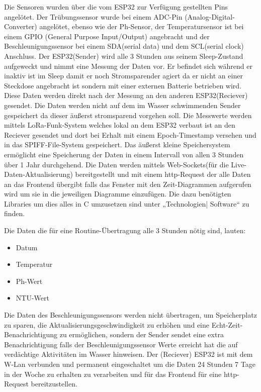 Die Sensoren wurden über die vom ESP32 zur Verfügung gestellten Pins angelötet. 
Der Trübungssensor wurde bei einem ADC-Pin (Analog-Digital-Converter) angelötet, 
ebenso wie der Ph-Sensor, der Temperatursensor ist bei einem GPIO (General Purpose Input/Output) angebracht und der Beschleunigungssensor bei einem SDA(serial data) und dem SCL(serial clock) Anschluss. 
Der ESP32(Sender) wird alle 3 Stunden aus seinem Sleep-Zustand aufgeweckt und nimmt eine Messung der Daten vor. Er befindet sich während er inaktiv ist im Sleep damit er noch Stromsparender agiert da er nicht an einer Steckdose angebracht ist sondern mit einer externen Batterie betrieben wird.
Diese Daten werden direkt nach der Messung an den anderen ESP32(Reciever) gesendet. 
Die Daten werden nicht auf dem im Wasser schwimmenden Sender gespeichert da dieser äußerst stromsparend vorgehen soll. 
Die Messwerte werden mittels LoRa-Funk-System welches lokal an dem ESP32 verbaut ist an den Reciever gesendet und dort bei Erhalt mit einem Epoch-Timestamp versehen und in das SPIFF-File-System gespeichert. 
Das äußerst kleine Speichersystem ermöglicht eine Speicherung der Daten in einem Intervall von allen 3 Stunden über 1 Jahr durchgehend. 
Die Daten werden mittels Web-Sockets(für die Live-Daten-Aktualisierung) bereitgestellt und mit einem http-Request der alle Daten an das Frontend übergibt falls das Fenster mit den Zeit-Diagrammen aufgerufen wird um sie in die jeweiligen Diagramme einzufügen. 
Die dazu benötigten Libraries um dies alles in C umzusetzen sind unter „Technologien| Software“ zu finden. 

\newpage
Die Daten die für eine Routine-Übertragung alle 3 Stunden nötig sind, lauten:

\begin{itemize}
  \item Datum
  \item Temperatur
  \item Ph-Wert
  \item NTU-Wert
\end{itemize}

Die Daten des Beschleunigungssensors werden nicht übertragen, um Speicherplatz zu sparen, die Aktualisierungsgeschwindigkeit 
zu erhöhen und eine Echt-Zeit-Benachrichtigung zu ermöglichen, sondern der Sender sendet eine extra Benachrichtigung falls 
der Beschleunigungssensor Werte erreicht hat die auf verdächtige Aktivitäten im Wasser hinweisen. 
Der (Reciever) ESP32 ist  mit dem W-Lan verbunden und permanent eingeschaltet um die Daten 24 Stunden 7 Tage 
in der Woche zu erhalten zu verarbeiten und für das Frontend für eine http-Request bereitzustellen. 


